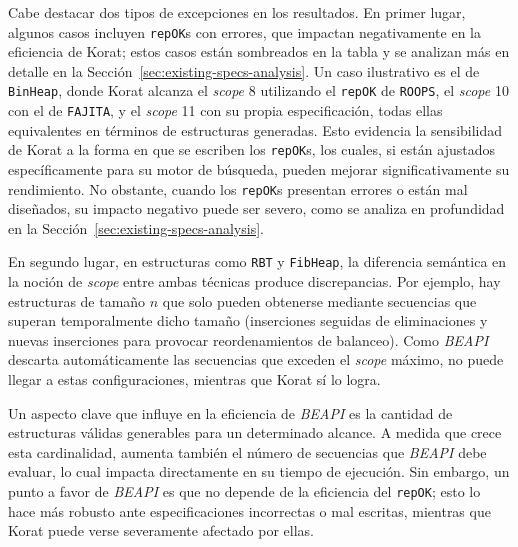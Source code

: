 Cabe destacar dos tipos de excepciones en los resultados. En primer lugar, algunos casos incluyen 
\texttt{repOK}s con errores, que impactan negativamente en la eficiencia de \textsf{Korat}; estos 
casos están sombreados en la tabla y se analizan más en detalle en la Sección~\ref{sec:existing-specs-analysis}. 
Un caso ilustrativo es el de \texttt{BinHeap}, donde \textsf{Korat} alcanza el \emph{scope} 8 utilizando 
el \texttt{repOK} de \texttt{ROOPS}, el \emph{scope} 10 con el de \texttt{FAJITA}, y el \emph{scope} 11 
con su propia especificación, todas ellas equivalentes en términos de estructuras generadas. Esto evidencia 
la sensibilidad de \textsf{Korat} a la forma en que se escriben los \texttt{repOK}s, los cuales, si están 
ajustados específicamente para su motor de búsqueda, pueden mejorar significativamente su rendimiento. 
No obstante, cuando los \texttt{repOK}s presentan errores o están mal diseñados, su impacto negativo 
puede ser severo, como se analiza en profundidad en la Sección~\ref{sec:existing-specs-analysis}.

En segundo lugar, en estructuras como \texttt{RBT} y \texttt{FibHeap}, la diferencia semántica en la 
noción de \emph{scope} entre ambas técnicas produce discrepancias. Por ejemplo, hay estructuras de 
tamaño $n$ que solo pueden obtenerse mediante secuencias que superan temporalmente dicho tamaño 
(inserciones seguidas de eliminaciones y nuevas inserciones para provocar reordenamientos de balanceo). 
Como \emph{BEAPI} descarta automáticamente las secuencias que exceden el \emph{scope} máximo, no puede 
llegar a estas configuraciones, mientras que \textsf{Korat} sí lo logra.

Un aspecto clave que influye en la eficiencia de \emph{BEAPI} es la cantidad de estructuras válidas 
generables para un determinado alcance. A medida que crece esta cardinalidad, aumenta también el 
número de secuencias que \emph{BEAPI} debe evaluar, lo cual impacta directamente en su tiempo de 
ejecución. Sin embargo, un punto a favor de \emph{BEAPI} es que no depende de la eficiencia del 
\texttt{repOK}; esto lo hace más robusto ante especificaciones incorrectas o mal escritas, mientras 
que \textsf{Korat} puede verse severamente afectado por ellas.



